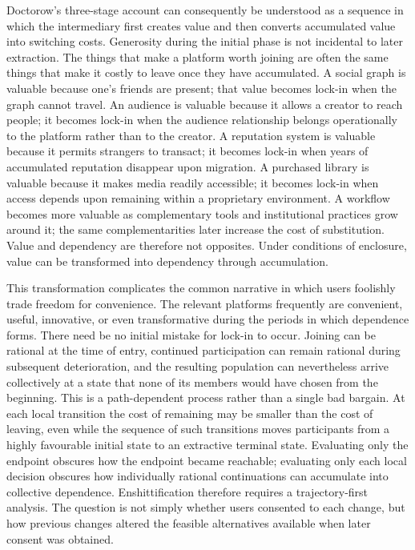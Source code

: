 \documentclass[11pt]{article}
\begin{document}
Doctorow's three-stage account can consequently be understood as a sequence in which the intermediary first creates value and then converts accumulated value into switching costs. Generosity during the initial phase is not incidental to later extraction. The things that make a platform worth joining are often the same things that make it costly to leave once they have accumulated. A social graph is valuable because one's friends are present; that value becomes lock-in when the graph cannot travel. An audience is valuable because it allows a creator to reach people; it becomes lock-in when the audience relationship belongs operationally to the platform rather than to the creator. A reputation system is valuable because it permits strangers to transact; it becomes lock-in when years of accumulated reputation disappear upon migration. A purchased library is valuable because it makes media readily accessible; it becomes lock-in when access depends upon remaining within a proprietary environment. A workflow becomes more valuable as complementary tools and institutional practices grow around it; the same complementarities later increase the cost of substitution. Value and dependency are therefore not opposites. Under conditions of enclosure, value can be transformed into dependency through accumulation.

This transformation complicates the common narrative in which users foolishly trade freedom for convenience. The relevant platforms frequently are convenient, useful, innovative, or even transformative during the periods in which dependence forms. There need be no initial mistake for lock-in to occur. Joining can be rational at the time of entry, continued participation can remain rational during subsequent deterioration, and the resulting population can nevertheless arrive collectively at a state that none of its members would have chosen from the beginning. This is a path-dependent process rather than a single bad bargain. At each local transition the cost of remaining may be smaller than the cost of leaving, even while the sequence of such transitions moves participants from a highly favourable initial state to an extractive terminal state. Evaluating only the endpoint obscures how the endpoint became reachable; evaluating only each local decision obscures how individually rational continuations can accumulate into collective dependence. Enshittification therefore requires a trajectory-first analysis. The question is not simply whether users consented to each change, but how previous changes altered the feasible alternatives available when later consent was obtained.
\end{document}

